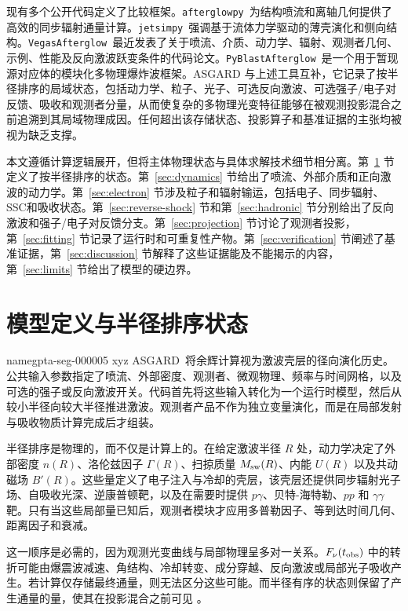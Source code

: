 \documentclass[twocolumn]{aastex702}
\makeatletter
\newcommand{\asgard}{\textsc{ASGARD}}
\newcommand{\afterglowpy}{\texttt{afterglowpy}}
\newcommand{\jetsimpy}{\texttt{jetsimpy}}
\newcommand{\vegas}{\texttt{VegasAfterglow}}
\newcommand{\pyblast}{\texttt{PyBlastAfterglow}}
\providecommand{\gptareaderanchor}[1]{\pdfdest name{#1} xyz}%
\providecommand{\gptareaderanchor}[1]{\special{pdf:dest (#1) [ @thispage /XYZ @xpos @ypos null ]}}%
\makeatother
\begin{document}
现有多个公开代码定义了比较框架。\afterglowpy\ 为结构喷流和离轴几何提供了高效的同步辐射通量计算\citep{Ryan2020}。\jetsimpy\ 强调基于流体力学驱动的薄壳演化和侧向结构\citep{Wang2024Jetsimpy}。\vegas\ 最近发表了关于喷流、介质、动力学、辐射、观测者几何、示例、性能及反向激波跃变条件的代码论文\citep{Wang2025VegasAfterglow}。\pyblast\ 是一个用于暂现源对应体的模块化多物理爆炸波框架\citep{Nedora2025PyBlastAfterglow}。ASGARD 与上述工具互补，它记录了按半径排序的局域状态，包括动力学、粒子、光子、可选反向激波、可选强子/电子对反馈、吸收和观测者分量，从而使复杂的多物理光变特征能够在被观测投影混合之前追溯到其局域物理成因。任何超出该存储状态、投影算子和基准证据的主张均被视为缺乏支撑。

本文遵循计算逻辑展开，但将主体物理状态与具体求解技术细节相分离。第~\ref{sec:contract} 节定义了按半径排序的状态。第~\ref{sec:dynamics} 节给出了喷流、外部介质和正向激波的动力学。第~\ref{sec:electron} 节涉及粒子和辐射输运，包括电子、同步辐射、SSC和吸收状态。第~\ref{sec:reverse-shock} 节和第~\ref{sec:hadronic} 节分别给出了反向激波和强子/电子对反馈分支。第~\ref{sec:projection} 节讨论了观测者投影，第~\ref{sec:fitting} 节记录了运行时和可重复性产物。第~\ref{sec:verification} 节阐述了基准证据，第~\ref{sec:discussion} 节解释了这些证据能及不能揭示的内容，第~\ref{sec:limits} 节给出了模型的硬边界。

\section{模型定义与半径排序状态} \label{sec:contract}


\gptareaderanchor{gpta-seg-000005}%
\asgard\ 将余辉计算视为激波壳层的径向演化历史。公共输入参数指定了喷流、外部密度、观测者、微观物理、频率与时间网格，以及可选的强子或反向激波开关。代码首先将这些输入转化为一个运行时模型，然后从较小半径向较大半径推进激波。观测者产品不作为独立变量演化，而是在局部发射与吸收物质计算完成后才组装。

半径排序是物理的，而不仅是计算上的。在给定激波半径 \(R\) 处，动力学决定了外部密度 \(n(R)\)、洛伦兹因子 \(\Gamma(R)\)、扫掠质量 \(M_{\rm sw}(R)\)、内能 \(U(R)\) 以及共动磁场 \(B'(R)\)。这些量定义了电子注入与冷却的壳层，该壳层还提供同步辐射光子场、自吸收光深、逆康普顿靶，以及在需要时提供 \(p\gamma\)、贝特-海特勒、\(pp\) 和 \(\gamma\gamma\) 靶。只有当这些局部量已知后，观测者模块才应用多普勒因子、等到达时间几何、距离因子和衰减。

这一顺序是必需的，因为观测光变曲线与局部物理呈多对一关系。\(F_\nu(t_{\rm obs})\) 中的转折可能由爆震波减速、角结构、冷却转变、成分穿越、反向激波或局部光子吸收产生。若计算仅存储最终通量，则无法区分这些可能。而半径有序的状态则保留了产生通量的量，使其在投影混合之前可见 \citep{Granot2002,vanEerten2010,vanEerten2012,vanEerten2018BlastWaves,Salafia2022JetStructure}。
\end{document}
